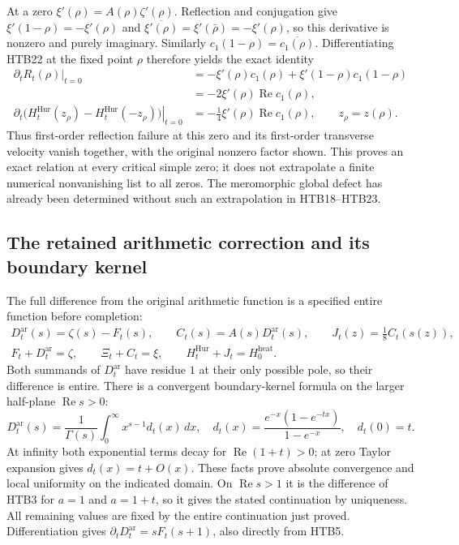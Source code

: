 \documentclass[11pt]{article}
\theoremstyle{definition}
\begin{document}
At a zero $\xi'(\rho)=A(\rho)\zeta'(\rho)$. Reflection and conjugation
give $\xi'(1-\rho)=-\xi'(\rho)$ and
$\overline{\xi'(\rho)}=\xi'(\bar\rho)=-\xi'(\rho)$, so this derivative
is nonzero and purely imaginary. Similarly
$c_1(1-\rho)=\overline{c_1(\rho)}$. Differentiating HTB22 at the fixed
point $\rho$ therefore yields the exact identity
\begin{equation}\tag{HTB25}
\begin{split}
 \left.\partial_tR_t(\rho)\right|_{t=0}
 &=-\xi'(\rho)c_1(\rho)
     +\xi'(1-\rho)c_1(1-\rho)\\
 &=-2\xi'(\rho)\operatorname{Re}c_1(\rho),\\
 \left.\partial_t\bigl(H_t^{\mathrm{Hur}}(z_\rho)
                 -H_t^{\mathrm{Hur}}(-z_\rho)\bigr)\right|_{t=0}
 &=-\frac14\xi'(\rho)\operatorname{Re}c_1(\rho),
 \qquad z_\rho=z(\rho).
\end{split}
\end{equation}
Thus first-order reflection failure at this zero and its first-order
transverse velocity vanish together, with the original nonzero factor
shown. This proves an exact relation at every critical simple zero;
it does not extrapolate a finite numerical nonvanishing list to all
zeros. The meromorphic global defect has already been determined
without such an extrapolation in HTB18--HTB23.

\subsection{The retained arithmetic correction and its boundary kernel}

The full difference from the original arithmetic function is a
specified entire function before completion:
\begin{equation}\tag{HTB26}
\begin{gathered}
 D_t^{\mathrm{ar}}(s)=\zeta(s)-F_t(s),\qquad
 C_t(s)=A(s)D_t^{\mathrm{ar}}(s),\qquad
 J_t(z)=\frac18C_t(s(z)),\\
 F_t+D_t^{\mathrm{ar}}=\zeta,\qquad
 \Xi_t+C_t=\xi,\qquad
 H_t^{\mathrm{Hur}}+J_t=H_0^{\mathrm{heat}}.
\end{gathered}
\end{equation}
Both summands of $D_t^{\mathrm{ar}}$ have residue $1$ at their only
possible pole, so their difference is entire. There is a convergent
boundary-kernel formula on the larger half-plane
$\operatorname{Re}s>0$:
\begin{equation}\tag{HTB27}
 D_t^{\mathrm{ar}}(s)=\frac1{\Gamma(s)}
   \int_0^{\infty}x^{s-1}d_t(x)\,dx,
 \quad
 d_t(x)=\frac{e^{-x}(1-e^{-t x})}{1-e^{-x}},\quad d_t(0)=t.
\end{equation}
At infinity both exponential terms decay for $\operatorname{Re}(1+t)>0$;
at zero Taylor expansion gives $d_t(x)=t+O(x)$. These facts prove
absolute convergence and local uniformity on the indicated domain.
On $\operatorname{Re}s>1$ it is the difference of HTB3 for $a=1$ and
$a=1+t$, so it gives the stated continuation by uniqueness. All
remaining values are fixed by the entire continuation just proved.
Differentiation gives
$\partial_tD_t^{\mathrm{ar}}=sF_t(s+1)$, also directly from HTB5.
\end{document}
